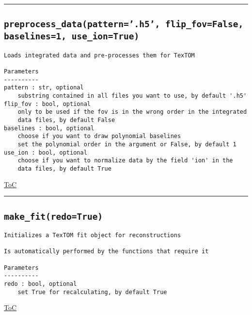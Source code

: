 \documentclass{article}
\begin{document}


\vspace{5mm}

\hrule

\subsection*{\texttt{preprocess\_data(pattern='.h5', flip\_fov=False, baselines=1, use\_ion=True)}}

\begin{lstlisting}[language=docstring]
Loads integrated data and pre-processes them for TexTOM

Parameters
----------
pattern : str, optional
    substring contained in all files you want to use, by default '.h5'
flip_fov : bool, optional
    only to be used if the fov is in the wrong order in the integrated
    data files, by default False
baselines : bool, optional
    choose if you want to draw polynomial baselines
    set the polynomial order in the argument or False, by default 1
use_ion : bool, optional
    choose if you want to normalize data by the field 'ion' in the 
    data files, by default True
\end{lstlisting}

\begin{flushright}

\hyperref[toc]{ToC}

\end{flushright}



\vspace{5mm}

\hrule

\subsection*{\texttt{make\_fit(redo=True)}}

\begin{lstlisting}[language=docstring]
Initializes a TexTOM fit object for reconstructions

Is automatically performed by the functions that require it

Parameters
----------
redo : bool, optional
    set True for recalculating, by default True
\end{lstlisting}

\begin{flushright}

\hyperref[toc]{ToC}

\end{flushright}
\end{document}
